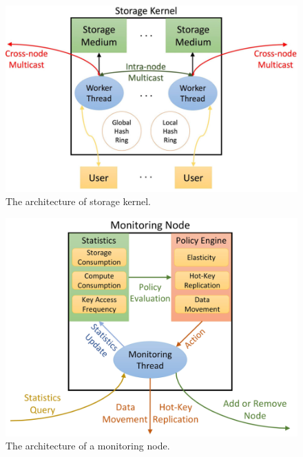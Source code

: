 \documentclass[14pt,oneside]{extreport}
\begin{document}
  \begin{figure}[htbp]
    \centerline{\includegraphics[scale=0.5]{images/paper2/storage_kernel.png}}
    \caption{The architecture of storage kernel.}
    \label{fig}
  \end{figure}

  \begin{figure}[htbp]
    \centerline{\includegraphics[scale=0.5]{images/paper2/monitoring_node.png}}
    \caption{The architecture of a monitoring node.}
    \label{fig}
  \end{figure}
\end{document}
